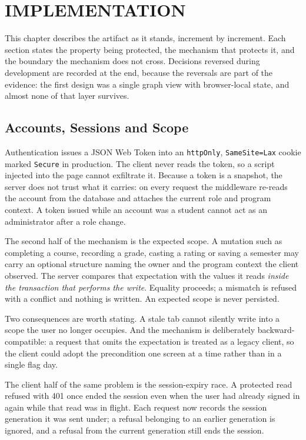 \chapter{IMPLEMENTATION}

\label{ch:implementation}

This chapter describes the artifact as it stands, increment by increment. Each section states the
property being protected, the mechanism that protects it, and the boundary the mechanism does not
cross. Decisions reversed during development are recorded at the end, because the reversals are
part of the evidence: the first design was a single graph view with browser-local state, and almost
none of that layer survives.

\section{Accounts, Sessions and Scope}

Authentication issues a JSON Web Token into an {\tt httpOnly}, {\tt SameSite=Lax} cookie marked
{\tt Secure} in production. The client never reads the token, so a script injected into the page
cannot exfiltrate it. Because a token is a snapshot, the server does not trust what it carries: on
every request the middleware re-reads the account from the database and attaches the current role
and program context. A token issued while an account was a student cannot act as an administrator
after a role change.

The second half of the mechanism is the expected scope. A mutation such as completing a course,
recording a grade, casting a rating or saving a semester may carry an optional structure naming the
owner and the program context the client observed. The server compares that expectation with the
values it reads \emph{inside the transaction that performs the write}. Equality proceeds; a
mismatch is refused with a conflict and nothing is written. An expected scope is never persisted.

Two consequences are worth stating. A stale tab cannot silently write into a scope the user no
longer occupies. And the mechanism is deliberately backward-compatible: a request that omits the
expectation is treated as a legacy client, so the client could adopt the precondition one screen at
a time rather than in a single flag day.

The client half of the same problem is the session-expiry race. A protected read refused with 401
once ended the session even when the user had already signed in again while that read was in
flight. Each request now records the session generation it was sent under; a refusal belonging to
an earlier generation is ignored, and a refusal from the current generation still ends the session.

